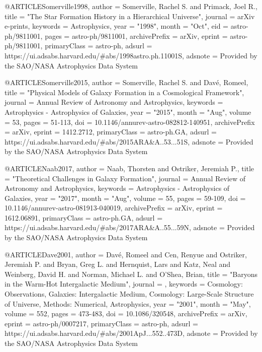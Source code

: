 {@ARTICLE{Somerville1998,
       author = {{Somerville}, Rachel S. and {Primack}, Joel R.},
        title = "{The Star Formation History in a Hierarchical Universe}",
      journal = {arXiv e-prints},
     keywords = {Astrophysics},
         year = "1998",
        month = "Oct",
          eid = {astro-ph/9811001},
        pages = {astro-ph/9811001},
archivePrefix = {arXiv},
       eprint = {astro-ph/9811001},
 primaryClass = {astro-ph},
       adsurl = {https://ui.adsabs.harvard.edu/\#abs/1998astro.ph.11001S},
      adsnote = {Provided by the SAO/NASA Astrophysics Data System}
}

@ARTICLE{Somerville2015,
       author = {{Somerville}, Rachel S. and {Dav{\'e}}, Romeel},
        title = "{Physical Models of Galaxy Formation in a Cosmological Framework}",
      journal = {Annual Review of Astronomy and Astrophysics},
     keywords = {Astrophysics - Astrophysics of Galaxies},
         year = "2015",
        month = "Aug",
       volume = {53},
        pages = {51-113},
          doi = {10.1146/annurev-astro-082812-140951},
archivePrefix = {arXiv},
       eprint = {1412.2712},
 primaryClass = {astro-ph.GA},
       adsurl = {https://ui.adsabs.harvard.edu/\#abs/2015ARA&A..53...51S},
      adsnote = {Provided by the SAO/NASA Astrophysics Data System}
}

@ARTICLE{Naab2017,
       author = {{Naab}, Thorsten and {Ostriker}, Jeremiah P.},
        title = "{Theoretical Challenges in Galaxy Formation}",
      journal = {Annual Review of Astronomy and Astrophysics},
     keywords = {Astrophysics - Astrophysics of Galaxies},
         year = "2017",
        month = "Aug",
       volume = {55},
        pages = {59-109},
          doi = {10.1146/annurev-astro-081913-040019},
archivePrefix = {arXiv},
       eprint = {1612.06891},
 primaryClass = {astro-ph.GA},
       adsurl = {https://ui.adsabs.harvard.edu/\#abs/2017ARA&A..55...59N},
      adsnote = {Provided by the SAO/NASA Astrophysics Data System}
}

@ARTICLE{Dave2001,
       author = {{Dav{\'e}}, Romeel and {Cen}, Renyue and {Ostriker}, Jeremiah P. and
         {Bryan}, Greg L. and {Hernquist}, Lars and {Katz}, Neal and
         {Weinberg}, David H. and {Norman}, Michael L. and {O'Shea}, Brian},
        title = "{Baryons in the Warm-Hot Intergalactic Medium}",
      journal = {\apj},
     keywords = {Cosmology: Observations, Galaxies: Intergalactic Medium, Cosmology: Large-Scale Structure of Universe, Methods: Numerical, Astrophysics},
         year = "2001",
        month = "May",
       volume = {552},
        pages = {473-483},
          doi = {10.1086/320548},
archivePrefix = {arXiv},
       eprint = {astro-ph/0007217},
 primaryClass = {astro-ph},
       adsurl = {https://ui.adsabs.harvard.edu/\#abs/2001ApJ...552..473D},
      adsnote = {Provided by the SAO/NASA Astrophysics Data System}
}

}
